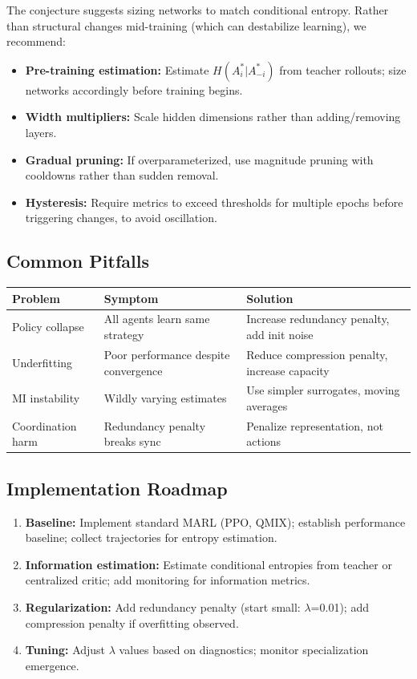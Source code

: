 \documentclass[10pt, letterpaper]{article}
\begin{document}
The conjecture suggests sizing networks to match conditional entropy. Rather than structural changes mid-training (which can destabilize learning), we recommend:
\begin{itemize}
    \item \textbf{Pre-training estimation:} Estimate $H(A_i^*|A_{-i}^*)$ from teacher rollouts; size networks accordingly before training begins.
    \item \textbf{Width multipliers:} Scale hidden dimensions rather than adding/removing layers.
    \item \textbf{Gradual pruning:} If overparameterized, use magnitude pruning with cooldowns rather than sudden removal.
    \item \textbf{Hysteresis:} Require metrics to exceed thresholds for multiple epochs before triggering changes, to avoid oscillation.
\end{itemize}

\subsection{Common Pitfalls}

\begin{center}
\begin{tabular}{lll}
\toprule
\textbf{Problem} & \textbf{Symptom} & \textbf{Solution} \\
\midrule
Policy collapse & All agents learn same strategy & Increase redundancy penalty, add init noise \\
Underfitting & Poor performance despite convergence & Reduce compression penalty, increase capacity \\
MI instability & Wildly varying estimates & Use simpler surrogates, moving averages \\
Coordination harm & Redundancy penalty breaks sync & Penalize representation, not actions \\
\bottomrule
\end{tabular}
\end{center}

\subsection{Implementation Roadmap}

\begin{enumerate}
    \item \textbf{Baseline:} Implement standard MARL (PPO, QMIX); establish performance baseline; collect trajectories for entropy estimation.
    \item \textbf{Information estimation:} Estimate conditional entropies from teacher or centralized critic; add monitoring for information metrics.
    \item \textbf{Regularization:} Add redundancy penalty (start small: $\lambda$=0.01); add compression penalty if overfitting observed.
    \item \textbf{Tuning:} Adjust $\lambda$ values based on diagnostics; monitor specialization emergence.
\end{enumerate}
\end{document}
